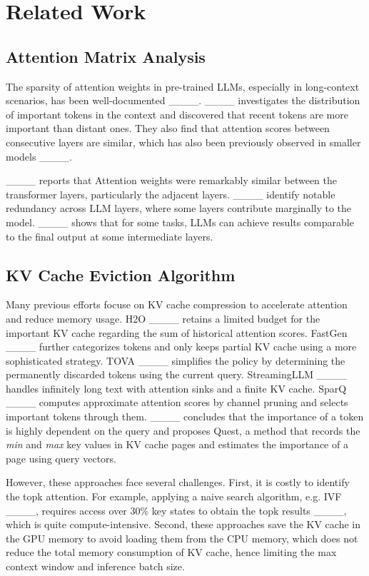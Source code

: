\section{Related Work}
\subsection{Attention Matrix Analysis}
The sparsity of attention weights in pre-trained LLMs,  especially in long-context scenarios,  has been well-documented ____. 
____ investigates the distribution of important tokens in the context and discovered that recent tokens are more important than distant ones. They also find that attention scores between consecutive layers are similar, which has also been previously observed in smaller models ____. 


____ reports that Attention weights were remarkably similar between the transformer layers,  particularly the adjacent layers. ____ identify notable redundancy across LLM layers,  where some layers contribute marginally to the model.  ____ shows that for some tasks,  LLMs can achieve results comparable to the final output at some intermediate layers. 



\subsection{KV Cache Eviction Algorithm}

Many previous efforts focuse on KV cache compression to accelerate attention and reduce memory usage. H2O ____ retains a limited budget for the important KV cache regarding the sum of historical attention scores. FastGen ____ further categorizes tokens and only keeps partial KV cache using a more sophisticated strategy. TOVA ____ simplifies the policy by determining the permanently discarded tokens using the current query. StreamingLLM ____ handles infinitely long text with attention sinks and a finite KV cache. SparQ ____ computes approximate attention scores by channel pruning and selects important tokens through them. ____ concludes that the importance of a token is highly dependent on the query and proposes Quest, a method that records the \textit{min} and \textit{max} key values in KV cache pages and estimates the importance of a page using query vectors. 


However, these approaches face several challenges. First, it is costly to identify the topk attention. For example, applying a naive search algorithm, e.g. IVF ____, requires access over $30\%$ key states to obtain the topk results ____, which is quite compute-intensive. Second, these approaches save the KV cache in the GPU memory to avoid loading them from the CPU memory, which does not reduce the total memory consumption of KV cache, hence limiting the max context window and inference batch size.

